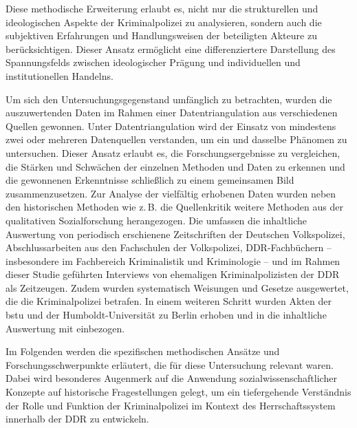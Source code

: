 Diese methodische Erweiterung erlaubt es, nicht nur die strukturellen und ideologischen Aspekte der Kriminalpolizei zu analysieren, sondern auch die subjektiven Erfahrungen und Handlungsweisen der beteiligten Akteure zu berücksichtigen. 
Dieser Ansatz ermöglicht eine differenziertere Darstellung des Spannungsfelds zwischen ideologischer Prägung und individuellen und institutionellen Handelns.\par

\par Um sich den Untersuchungsgegenstand umfänglich zu betrachten, wurden die auszuwertenden Daten im Rahmen einer Datentriangulation aus verschiedenen Quellen gewonnen. 
Unter Datentriangulation wird der Einsatz von mindestens zwei oder mehreren Datenquellen verstanden, um ein und dasselbe Phänomen zu untersuchen. %
Dieser Ansatz erlaubt es, die Forschungsergebnisse zu vergleichen, die Stärken und Schwächen der einzelnen Methoden und Daten zu erkennen und die gewonnenen Erkenntnisse schließlich zu einem gemeinsamen Bild zusammenzusetzen.\autocites[13]{Flick2011}[287]{Hussy2013}
Zur Analyse der vielfältig erhobenen Daten wurden neben den historischen Methoden wie z.\,B. die Quellenkritik weitere Methoden aus der qualitativen Sozialforschung herangezogen. 
Die umfassen die inhaltliche Auswertung von periodisch erschienene Zeitschriften der Deutschen Volkspolizei, Abschlussarbeiten aus den Fachschulen der Volkspolizei, DDR-Fachbüchern -- insbesondere im Fachbereich Kriminalistik und Kriminologie -- und im Rahmen dieser Studie geführten Interviews von ehemaligen Kriminalpolizisten der DDR als Zeitzeugen.
Zudem wurden systematisch Weisungen und Gesetze ausgewertet, die die Kriminalpolizei betrafen. 
In einem weiteren Schritt wurden Akten der \acrshort{bstu} und der Humboldt-Universität zu Berlin erhoben und in die inhaltliche Auswertung mit einbezogen.
\par Im Folgenden werden die spezifischen methodischen Ansätze und Forschungsschwerpunkte erläutert, die für diese Untersuchung relevant waren. 
Dabei wird besonderes Augenmerk auf die Anwendung sozialwissenschaftlicher Konzepte auf historische Fragestellungen gelegt, um ein tiefergehende Verständnis der Rolle und Funktion der Kriminalpolizei im Kontext des Herrschaftssystem innerhalb der DDR zu entwickeln.

